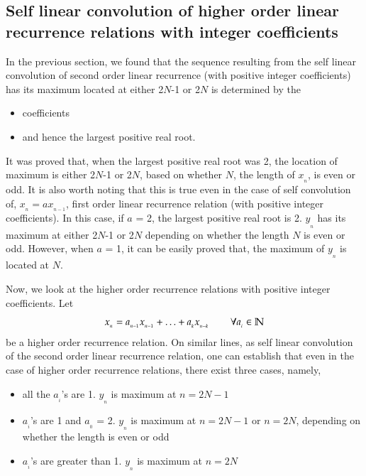 \begin{multicols}{2}
\section{Self linear convolution of higher order linear recurrence relations with integer coefficients}\label{section-19}

In the previous section, we found that the sequence resulting from the self linear convolution of second order linear recurrence (with positive integer coefficients) has its maximum located at either 2$N$-1 or 2$N$ is determined by the

\vspace{-.3cm}

\begin{itemize} 
 \setlength{\parskip}{0pt}
\item coefficients
\item and hence the largest positive real root. 
\end{itemize}

\vspace{-.3cm}

It was proved that, when the largest positive real root was 2, the location of maximum is either 2$N$-1 or 2$N$, based on whether $N$, the length of $x_{_n}$, is even or odd.
 It is also worth noting that this is true even in the case of self convolution of, $x_{_n} = a x_{_{n-1}}$, first order linear recurrence relation (with positive integer coefficients). In this case, if $a$ = 2, the largest positive real root is 2.  $y_{_n}$ has its maximum at either 2$N$-1 or 2$N$ depending on whether the length $N$ is even or odd.  However, when $a$ = 1, it can be easily proved that, the maximum of $y_{_n}$ is located at $N$. 
 
Now, we look at the higher order recurrence relations with positive integer coefficients. Let 
\begin{equation}
 x_{_n} = a_{_{n-1}}x_{_{n-1}} + \ldots + a_{_k}x_{_{n-k}} \hspace{0.3in} \forall a_{_i} \in \mathbb{N}\label{eq-19.1}
\end{equation}
be a higher order recurrence relation. On similar lines, as self linear convolution of the second order linear recurrence relation, one can establish that even in the case of higher order recurrence relations, there exist three cases, namely,

\vspace{-.3cm}

\begin{itemize}
\item all the $a_{_i}$'s are 1. $y_{_n}$ is maximum at $n = 2N-1$
\item $a_{_i}$'s are 1 and $a_{_0}$ = 2. $y_{_n}$ is maximum at $n = 2N-1$ or $n = 2N$, depending on whether the length is even or odd
\item $a_{_i}$'s are greater than 1. $y_{_n}$ is maximum at $n = 2N$
\end{itemize}


\end{multicols}
